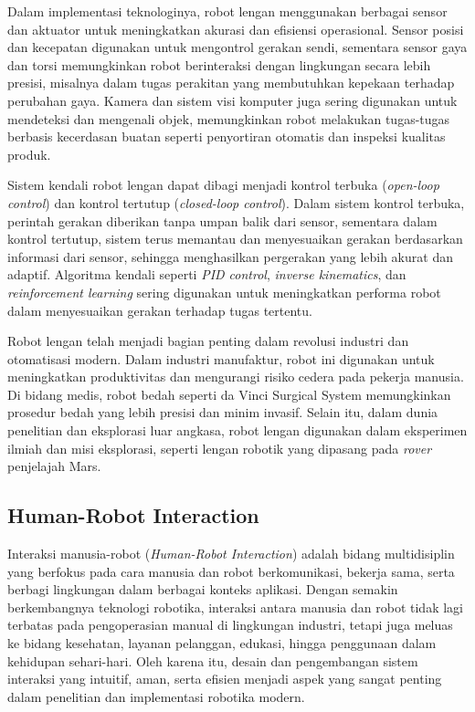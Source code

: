 Dalam implementasi teknologinya, robot lengan menggunakan berbagai sensor dan aktuator untuk
meningkatkan akurasi dan efisiensi operasional\parencite{ZhenXie_lbrgar}. Sensor posisi dan kecepatan digunakan untuk
mengontrol gerakan sendi, sementara sensor gaya dan torsi memungkinkan robot berinteraksi
dengan lingkungan secara lebih presisi, misalnya dalam tugas perakitan yang membutuhkan kepekaan
terhadap perubahan gaya. Kamera dan sistem visi komputer juga sering digunakan untuk mendeteksi
dan mengenali objek, memungkinkan robot melakukan tugas-tugas berbasis kecerdasan buatan
seperti penyortiran otomatis dan inspeksi kualitas produk.

Sistem kendali robot lengan dapat dibagi menjadi kontrol terbuka (\emph{open-loop control}) dan
kontrol tertutup (\emph{closed-loop control}). Dalam sistem kontrol terbuka, perintah gerakan diberikan
tanpa umpan balik dari sensor, sementara dalam kontrol tertutup, sistem terus memantau dan
menyesuaikan gerakan berdasarkan informasi dari sensor, sehingga menghasilkan pergerakan
yang lebih akurat dan adaptif. Algoritma kendali seperti \emph{PID control}, \emph{inverse kinematics},
dan \emph{reinforcement learning} sering digunakan untuk meningkatkan performa robot dalam
menyesuaikan gerakan terhadap tugas tertentu.

Robot lengan telah menjadi bagian penting dalam revolusi industri dan otomatisasi modern.
Dalam industri manufaktur, robot ini digunakan untuk meningkatkan produktivitas dan
mengurangi risiko cedera pada pekerja manusia. Di bidang medis, robot bedah seperti
da Vinci Surgical System memungkinkan prosedur bedah yang lebih presisi dan minim invasif.
Selain itu, dalam dunia penelitian dan eksplorasi luar angkasa, robot lengan digunakan
dalam eksperimen ilmiah dan misi eksplorasi, seperti lengan robotik yang dipasang pada \emph{rover} penjelajah Mars.

\subsection{Human-Robot Interaction}

Interaksi manusia-robot (\emph{Human-Robot Interaction}) adalah bidang multidisiplin yang berfokus
pada cara manusia dan robot berkomunikasi, bekerja sama, serta berbagi lingkungan dalam berbagai konteks aplikasi.
Dengan semakin berkembangnya teknologi robotika, interaksi antara manusia dan robot tidak lagi
terbatas pada pengoperasian manual di lingkungan industri, tetapi juga meluas ke bidang kesehatan, layanan pelanggan,
edukasi, hingga penggunaan dalam kehidupan sehari-hari. Oleh karena itu, desain dan pengembangan sistem interaksi yang intuitif,
aman, serta efisien menjadi aspek yang sangat penting dalam penelitian dan implementasi robotika modern.

